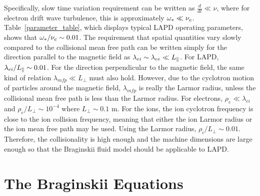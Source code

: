 Specifically, slow time variation requirement can be written as $\frac{d}{dt} \ll \nu$, where for electron drift wave turbulence, this is approximately $\omega_* \ll \nu_{e}$.
Table~\ref{parameter_table}, which displays typical LAPD operating parameters, shows that $\omega_* / \nu_{e} \sim 0.01$. 
The requirement that spatial quantities vary slowly compared to the collisional
mean free path can be written simply for the direction parallel to the magnetic field as $\lambda_{ei} \sim \lambda_{ee} \ll L_\parallel$. 
For LAPD, $\lambda_{ei} / L_\parallel \sim 0.01$. For the direction perpendicular
to the magnetic field, the same kind of relation $\lambda_{mfp} \ll L_\perp$ must also hold. However, due to the cyclotron motion of particles around the magnetic field, $\lambda_{mfp}$ is really
the Larmor radius, unless the collisional mean free path is less than the Larmor radius. For electrons, $\rho_e \ll \lambda_{ei}$ and $\rho_e/L_\perp \sim 10^{-4}$ where $L_\perp \sim 0.1$ m. 
For the ions, the ion cyclotron frequency is close to the ion collision frequency, meaning that either the ion Larmor radius or the ion mean free path may be used. 
Using the Larmor radius, $\rho_i/L_\perp \sim 0.01$. Therefore, the collisionality is high enough and the machine dimensions are large enough so that the Braginskii fluid model should be
applicable to LAPD.

\section{The Braginskii Equations}
\label{s_braginskii_eqns}


